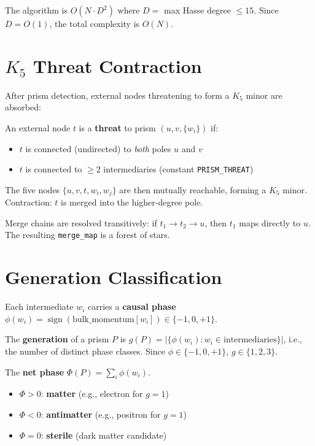 \documentclass[11pt, a4paper, openany]{book}
\newcommand{\code}[1]{\texttt{#1}}
\newcounter{thm}[chapter]
\begin{document}
\begin{result}
  The algorithm is $O(N \cdot D^2)$ where $D = $ max Hasse degree $\leq 15$.
  Since $D = O(1)$, the total complexity is $O(N)$.
\end{result}

\section{\texorpdfstring{$K_5$}{K5} Threat Contraction}

After prism detection, external nodes threatening to form a $K_5$ minor are
absorbed:

\begin{definition}
  An external node $t$ is a \textbf{threat} to prism $(u, v, \{w_i\})$ if:
  \begin{itemize}
    \item $t$ is connected (undirected) to \emph{both} poles $u$ and $v$
    \item $t$ is connected to $\geq 2$ intermediaries (constant \code{PRISM\_THREAT})
  \end{itemize}
  The five nodes $\{u, v, t, w_i, w_j\}$ are then mutually reachable, forming a
  $K_5$ minor.  Contraction: $t$ is merged into the higher-degree pole.
\end{definition}

Merge chains are resolved transitively: if $t_1 \to t_2 \to u$, then $t_1$ maps
directly to $u$.  The resulting \code{merge\_map} is a forest of stars.

\section{Generation Classification}

Each intermediate $w_i$ carries a \textbf{causal phase}
$\phi(w_i) = \operatorname{sign}(\text{bulk\_momentum}[w_i]) \in \{-1, 0, +1\}$.

\begin{definition}
  The \textbf{generation} of a prism $P$ is
  $g(P) = |\{\phi(w_i) : w_i \in \text{intermediaries}\}|$, i.e., the number of
  distinct phase classes.  Since $\phi \in \{-1, 0, +1\}$, $g \in \{1, 2, 3\}$.
\end{definition}

\begin{definition}
  The \textbf{net phase} $\Phi(P) = \sum_i \phi(w_i)$.
  \begin{itemize}
    \item $\Phi > 0$: \textbf{matter} (e.g., electron for $g=1$)
    \item $\Phi < 0$: \textbf{antimatter} (e.g., positron for $g=1$)
    \item $\Phi = 0$: \textbf{sterile} (dark matter candidate)
  \end{itemize}
\end{definition}
\end{document}
